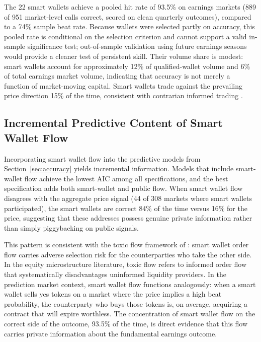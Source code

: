 \documentclass[11pt]{article}
\begin{document}
The 22 smart wallets achieve a pooled hit rate of 93.5\% on earnings markets (889 of 951 market-level calls correct, scored on clean quarterly outcomes), compared to a 74\% sample beat rate. Because wallets were selected partly on accuracy, this pooled rate is conditional on the selection criterion and cannot support a valid in-sample significance test; out-of-sample validation using future earnings seasons would provide a cleaner test of persistent skill. Their volume share is modest: smart wallets account for approximately 12\% of qualified-wallet volume and 6\% of total earnings market volume, indicating that accuracy is not merely a function of market-moving capital. Smart wallets trade against the prevailing price direction 15\% of the time, consistent with contrarian informed trading \citep{kyle1985continuous}.

\subsection{Incremental Predictive Content of Smart Wallet Flow}

Incorporating smart wallet flow into the predictive models from Section~\ref{sec:accuracy} yields incremental information. Models that include smart-wallet flow achieve the lowest AIC among all specifications, and the best specification adds both smart-wallet and public flow. When smart wallet flow disagrees with the aggregate price signal (44 of 308 markets where smart wallets participated), the smart wallets are correct 84\% of the time versus 16\% for the price, suggesting that these addresses possess genuine private information rather than simply piggybacking on public signals.

This pattern is consistent with the toxic flow framework of \citet{easley2012flow}: smart wallet order flow carries adverse selection risk for the counterparties who take the other side. In the equity microstructure literature, toxic flow refers to informed order flow that systematically disadvantages uninformed liquidity providers. In the prediction market context, smart wallet flow functions analogously: when a smart wallet sells yes tokens on a market where the price implies a high beat probability, the counterparty who buys those tokens is, on average, acquiring a contract that will expire worthless. The concentration of smart wallet flow on the correct side of the outcome, 93.5\% of the time, is direct evidence that this flow carries private information about the fundamental earnings outcome.
\end{document}
